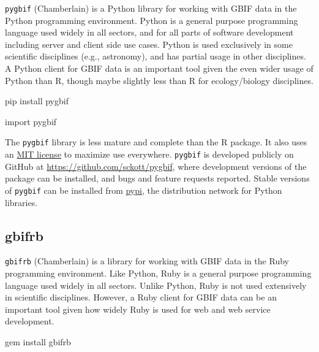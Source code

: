 \documentclass[author-year, review, 11pt]{components/elsarticle} %
\newenvironment{Shaded}{\begin{snugshade}}{\end{snugshade}}
\newcommand{\ImportTok}[1]{#1}
\newcommand{\NormalTok}[1]{#1}
\begin{document}
\texttt{pygbif} (Chamberlain) is a Python library for working with GBIF
data in the Python programming environment. Python is a general purpose
programming language used widely in all sectors, and for all parts of
software development including server and client side use cases. Python
is used exclusively in some scientific disciplines (e.g., astronomy),
and has partial usage in other disciplines. A Python client for GBIF
data is an important tool given the even wider usage of Python than R,
though maybe slightly less than R for ecology/biology disciplines.

\begin{Shaded}
\begin{Highlighting}[]
\NormalTok{pip install pygbif}
\end{Highlighting}
\end{Shaded}

\begin{Shaded}
\begin{Highlighting}[]
\ImportTok{import}\NormalTok{ pygbif}
\end{Highlighting}
\end{Shaded}

The \texttt{pygbif} library is less mature and complete than the R
package. It also uses an
\href{http://choosealicense.com/licenses/mit/}{MIT license} to maximize
use everywhere. \texttt{pygbif} is developed publicly on GitHub at
\url{https://github.com/sckott/pygbif}, where development versions of
the package can be installed, and bugs and feature requests reported.
Stable versions of \texttt{pygbif} can be installed from
\href{https://pypi.python.org/pypi/pygbif}{pypi}, the distribution
network for Python libraries.

\subsection{gbifrb}\label{gbifrb}

\texttt{gbifrb} (Chamberlain) is a library for working with GBIF data in
the Ruby programming environment. Like Python, Ruby is a general purpose
programming language used widely in all sectors. Unlike Python, Ruby is
not used extensively in scientific disciplines. However, a Ruby client
for GBIF data can be an important tool given how widely Ruby is used for
web and web service development.

\begin{Shaded}
\begin{Highlighting}[]
\NormalTok{gem install gbifrb}
\end{Highlighting}
\end{Shaded}
\end{document}
